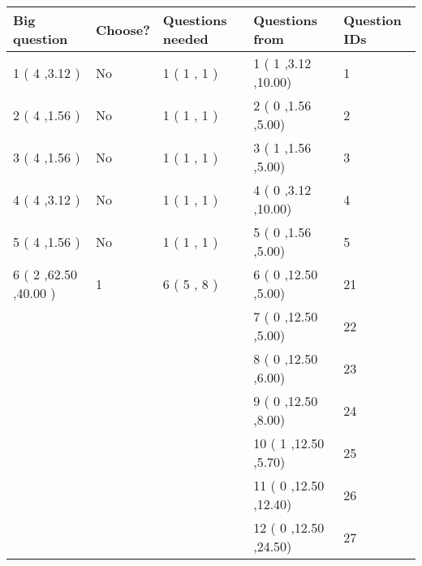 \documentclass[12pt]{article}
\begin{document}
   
\noindent\hspace{-0.4in}\begin{tabular}{|l|l|l|l|l|}
\hline
 Big question & Choose? & Questions needed & Questions from & Question IDs \\ 
\hline
           1 (           4 ,3.12
 ) &  No   & 
           1 (           1 ,            1 ) &            1 (           1
,3.12
 ,10.00) &            1  \\
 \hline
           2 (           4 ,1.56
 ) &  No   & 
           1 (           1 ,            1 ) &            2 (           0
,1.56
 ,5.00) &            2  \\
 \hline
           3 (           4 ,1.56
 ) &  No   & 
           1 (           1 ,            1 ) &            3 (           1
,1.56
 ,5.00) &            3  \\
 \hline
           4 (           4 ,3.12
 ) &  No   & 
           1 (           1 ,            1 ) &            4 (           0
,3.12
 ,10.00) &            4  \\
 \hline
           5 (           4 ,1.56
 ) &  No   & 
           1 (           1 ,            1 ) &            5 (           0
,1.56
 ,5.00) &            5  \\
 \hline
           6 (           2 ,62.50
,40.00
 ) &            1  & 
           6 (           5 ,            8 ) &            6 (           0
,12.50
 ,5.00) &           21  \\
  & & &            7 (           0
 ,12.50
 ,5.00) &           22  \\
  & & &            8 (           0
 ,12.50
 ,6.00) &           23  \\
  & & &            9 (           0
 ,12.50
 ,8.00) &           24  \\
  & & &           10 (           1
 ,12.50
 ,5.70) &           25  \\
  & & &           11 (           0
 ,12.50
 ,12.40) &           26  \\
  & & &           12 (           0
 ,12.50
 ,24.50) &           27  \\
 \hline
 \end{tabular}
   
   
 \vspace{0.2in}
   
\end{document}
